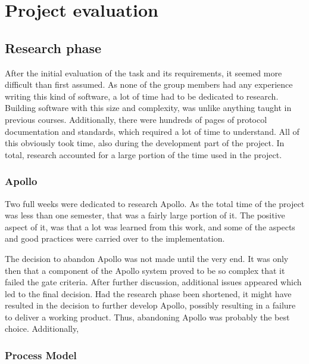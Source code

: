 
\chapter{Project evaluation}
\label{ch:project_evaluation}

\section{Research phase}
\label{sec:project_evaluation-research_phase}

After the initial evaluation of the task and its requirements, it seemed more difficult than first assumed. As none of the group members had any experience writing this kind of software, a lot of time had to be dedicated to research. Building software with this size and complexity, was unlike anything taught in previous courses. Additionally, there were hundreds of pages of protocol documentation and standards, which required a lot of time to understand. All of this obviously took time, also during the development part of the project. In total, research accounted for a large portion of the time used in the project.

\subsection{Apollo}
\label{subsec:project_evaluation-research_phase-apollo}

Two full weeks were dedicated to research Apollo. As the total time of the project was less than one semester, that was a fairly large portion of it. The positive aspect of it, was that a lot was learned from this work, and some of the aspects and good practices were carried over to the implementation.

The decision to abandon Apollo was not made until the very end. It was only then that a component of the Apollo system proved to be so complex that it failed the gate criteria. After further discussion, additional issues appeared which led to the final decision. Had the research phase been shortened, it might have resulted in the decision to further develop Apollo, possibly resulting in a failure to deliver a working product. Thus, abandoning Apollo was probably the best choice. Additionally, 


\subsection{Process Model}
\label{subsec:project_evaluation-research_phase-process_model}

